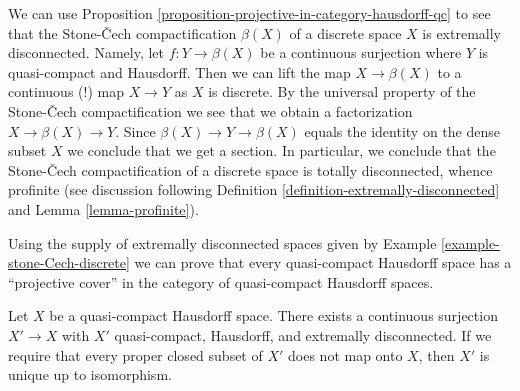 \begin{example}
\label{example-stone-Cech-discrete}
We can use Proposition \ref{proposition-projective-in-category-hausdorff-qc}
to see that the Stone-{\v C}ech compactification $\beta(X)$ of a discrete
space $X$ is extremally disconnected. Namely, let $f : Y \to \beta(X)$ be
a continuous surjection where $Y$ is quasi-compact and Hausdorff. Then
we can lift the map $X \to \beta(X)$ to a continuous (!) map
$X \to Y$ as $X$ is discrete. By the universal property of the
Stone-{\v C}ech compactification we see that we obtain a factorization
$X \to \beta(X) \to Y$. Since $\beta(X) \to Y \to \beta(X)$ equals
the identity on the dense subset $X$ we conclude that we get a section.
In particular, we conclude that the Stone-{\v C}ech compactification
of a discrete space is totally disconnected, whence profinite
(see discussion following
Definition \ref{definition-extremally-disconnected} and
Lemma \ref{lemma-profinite}).
\end{example}

\noindent
Using the supply of extremally disconnected spaces given by
Example \ref{example-stone-Cech-discrete}
we can prove that every quasi-compact Hausdorff space has a
``projective cover'' in the category of quasi-compact Hausdorff spaces.

\begin{lemma}
\label{lemma-existence-projective-cover}
Let $X$ be a quasi-compact Hausdorff space.
There exists a continuous surjection $X' \to X$ with $X'$
quasi-compact, Hausdorff, and extremally disconnected.
If we require that every proper closed subset of $X'$ does not
map onto $X$, then $X'$ is unique up to isomorphism.
\end{lemma}

